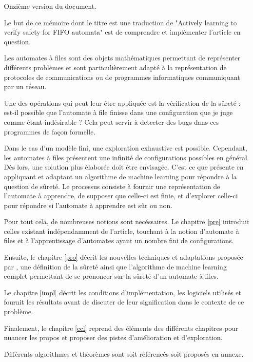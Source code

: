 Onzième version du document.

Le but de ce mémoire dont le titre est une traduction de "Actively learning to verify safety for FIFO automata" \cite{Vardhan04} est de comprendre et implémenter l'article en question.

Les automates à files sont des objets mathématiques permettant de représenter différents problèmes et sont particulièrement adapté à la représentation de protocoles de communications ou de programmes informatiques communiquant par un réseau.

Une des opérations qui peut leur être appliquée est la vérification de la sûreté : est-il possible que l'automate à file finisse dans une configuration que je juge comme étant indésirable ? Cela peut servir à detecter des bugs dans ces programmes de façon formelle.

Dans le cas d'un modèle fini, une exploration exhaustive est possible. Cependant, les automates à files présentent une infinité de configurations possibles en général. Dès lors, une solution plus élaborée doit être envisagée. C'est ce que présente \cite{Vardhan04} en appliquant et adaptant un algorithme de machine learning pour répondre à la question de sûreté. Le processus consiste à fournir une représentation de l'automate à apprendre, de supposer que celle-ci est finie, et d'explorer celle-ci pour répondre si l'automate à apprendre est sûr ou non.

Pour tout cela, de nombreuses notions sont necéssaires. Le chapitre \ref{pre} introduit celles existant indépendamment de l'article, touchant à la notion d'automate à files et à l'apprentissage d'automates ayant un nombre fini de configurations.

Ensuite, le chapitre \ref{pro} décrit les nouvelles techniques et adaptations proposée par \cite{Vardhan04}, une définition de la sûreté ainsi que l'algorithme de machine learning complet permettant de se prononcer sur la sûreté d'un automate à files.


Le chapitre \ref{impl} décrit les conditions d'implémentation, les logiciels utilisés et fournit les résultats avant de discuter de leur signification dans le contexte de ce problème.

Finalement, le chapitre \ref{ccl} reprend des éléments des différents chapitres pour nuancer les propos et proposer des pistes d'amélioration et d'exploration.

Différents algorithmes et théorèmes sont soit référencés soit proposés en annexe.
